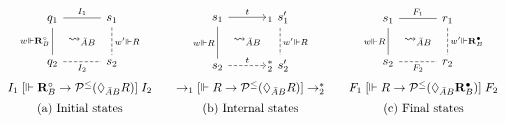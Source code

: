 \documentclass[acmsmall,screen,review,anonymous]{acmart}
\newcommand{\ifr}[1]{\mathrel{[{#1}]}}
\newcommand{\que}{\circ}
\newcommand{\ans}{\bullet}
\begin{document}
\begin{figure} %
  \small
  \[
    \begin{array}{c@{\qquad}c@{\qquad}c}
      \begin{tikzcd}[sep=tiny,column sep=0]
        q_1 \ar[dd, "w \Vdash \mathbf{R}_B^\que"', dash] \ar[rr, dash, "I_1"] &&
        s_1 \ar[dd, "w' \Vdash R", dash, dashed] \\
        & \leadsto_{\bar{A}B} & \\
        q_2 \ar[rr, "I_2"', dash, dashed] &&
        s_2
      \end{tikzcd}
      &
      \begin{tikzcd}[sep=tiny,column sep=0]
        s_1 \ar[rr, "t"] \ar[dd, "w \Vdash R"', dash] &&
        \!\!{}_1 \:\, s_1' \ar[dd, "w' \Vdash R", dash, dashed] \\
        & \leadsto_{\bar{A}B} & \\
        s_2 \ar[rr, "t", dashed] &&
        \!\!{}_2^* \:\, s_2'
      \end{tikzcd}
      &
      \begin{tikzcd}[sep=tiny, column sep=0]
        s_1 \ar[rr, "F_1", dash] \ar[dd, "w \Vdash R"', dash] &&
        r_1 \ar[dd, "w' \Vdash \mathbf{R}_B^\ans", dash, dashed] \\
        & \leadsto_{\bar{A}B} & \\
        s_2 \ar[rr, "F_2"', dash, dashed] &&
        r_2
      \end{tikzcd}
      \vspace{1ex} \\
      I_1 \ifr{\Vdash \mathbf{R}_B^\que \rightarrow
        \mathcal{P}^\le(\Diamond_{\bar{A}B} R)} I_2
      &
      {\rightarrow_1}
      \ifr{\Vdash R \rightarrow \mathcal{P}^\le(\Diamond_{\bar{A}B} R)}
      {\rightarrow_2^*}
      &
      F_1
      \ifr{\Vdash R \rightarrow \mathcal{P}^\le(\Diamond_{\bar{A}B} \mathbf{R}_B^\ans)}
      F_2
      \vspace{1.2ex} \\
      \text{(a) Initial states} &
      \text{(b) Internal states} &
      \text{(c) Final states}
    \end{array}
  \]
  \[
    \begin{array}{c}

\end{array}\]
\end{figure}
\end{document}
